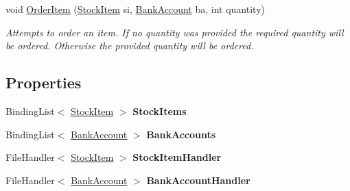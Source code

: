 \begin{DoxyCompactItemize}
void \hyperlink{class_application_logic_1_1_model_1_1_app_data_manager_a3d9fae714bf8a482a6648a2913fbc9de}{OrderItem} (\hyperlink{class_application_logic_1_1_model_1_1_stock_item}{StockItem} si, \hyperlink{class_application_logic_1_1_model_1_1_bank_account}{BankAccount} ba, int quantity)
\begin{DoxyCompactList}\small\item\em Attempts to order an item. If no quantity was provided the required quantity will be ordered. Otherwise the provided quantity will be ordered. \item\end{DoxyCompactList}\end{DoxyCompactItemize}
\subsection*{Properties}
\begin{DoxyCompactItemize}
\item 
\hypertarget{class_application_logic_1_1_model_1_1_app_data_manager_a79dc47f13d21e4e642f6ded6acb5b0e7}{
BindingList$<$ \hyperlink{class_application_logic_1_1_model_1_1_stock_item}{StockItem} $>$ {\bfseries StockItems}}
\label{class_application_logic_1_1_model_1_1_app_data_manager_a79dc47f13d21e4e642f6ded6acb5b0e7}

\item 
\hypertarget{class_application_logic_1_1_model_1_1_app_data_manager_a238a74e43986f8b3d868cb934fba4462}{
BindingList$<$ \hyperlink{class_application_logic_1_1_model_1_1_bank_account}{BankAccount} $>$ {\bfseries BankAccounts}}
\label{class_application_logic_1_1_model_1_1_app_data_manager_a238a74e43986f8b3d868cb934fba4462}

\item 
\hypertarget{class_application_logic_1_1_model_1_1_app_data_manager_a46f9d4c52d73f7101814771c37e90dd2}{
FileHandler$<$ \hyperlink{class_application_logic_1_1_model_1_1_stock_item}{StockItem} $>$ {\bfseries StockItemHandler}}
\label{class_application_logic_1_1_model_1_1_app_data_manager_a46f9d4c52d73f7101814771c37e90dd2}

\item 
\hypertarget{class_application_logic_1_1_model_1_1_app_data_manager_ab4a14edb0f427e31a7129e7fb6606036}{
FileHandler$<$ \hyperlink{class_application_logic_1_1_model_1_1_bank_account}{BankAccount} $>$ {\bfseries BankAccountHandler}}
\label{class_application_logic_1_1_model_1_1_app_data_manager_ab4a14edb0f427e31a7129e7fb6606036}

\end{DoxyCompactItemize}


